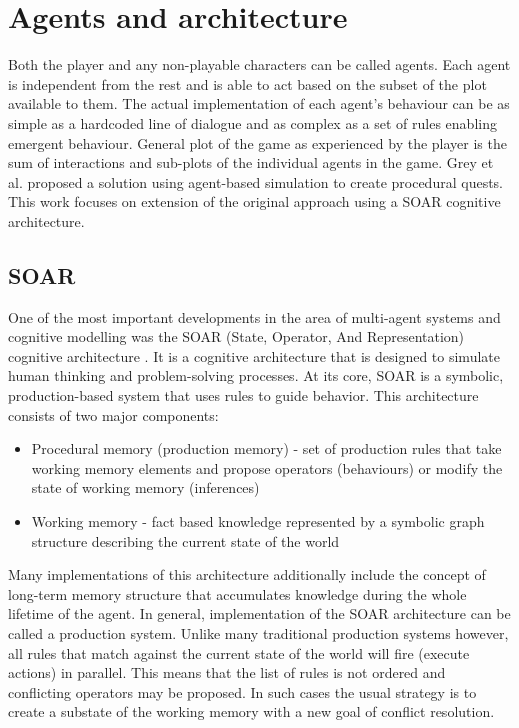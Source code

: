 
\section{Agents and architecture}

Both the player and any non-playable characters can be called agents.
Each agent is independent from the rest and is able to act based on the subset of the plot available to them.
The actual implementation of each agent's behaviour can be as simple as a hardcoded line of dialogue and as complex as a set of rules enabling emergent behaviour.
General plot of the game as experienced by the player is the sum of interactions and sub-plots of the individual agents in the game.
Grey et al.\cite{grey2011procedural} proposed a solution using agent-based simulation to create procedural quests.
This work focuses on extension of the original approach using a SOAR cognitive architecture\cite{rosenbloom1993soar}.

\subsection{SOAR}

One of the most important developments in the area of multi-agent systems and cognitive modelling was the SOAR (State, Operator, And Representation) cognitive architecture \cite{laird2019soar}.
It is a cognitive architecture that is designed to simulate human thinking and problem-solving processes.
At its core, SOAR is a symbolic, production-based system that uses rules to guide behavior.
This architecture consists of two major components:

\begin{itemize}
    \item Procedural memory (production memory) - set of production rules that take working memory elements and propose operators (behaviours) or modify the state of working memory (inferences)
    \item Working memory - fact based knowledge represented by a symbolic graph structure describing the current state of the world
\end{itemize}

Many implementations of this architecture additionally include the concept of long-term memory structure that accumulates knowledge during the whole lifetime of the agent.
In general, implementation of the SOAR architecture can be called a production system.
Unlike many traditional production systems however, all rules that match against the current state of the world will fire (execute actions) in parallel.
This means that the list of rules is not ordered and conflicting operators may be proposed.
In such cases the usual strategy is to create a substate of the working memory with a new goal of conflict resolution.


